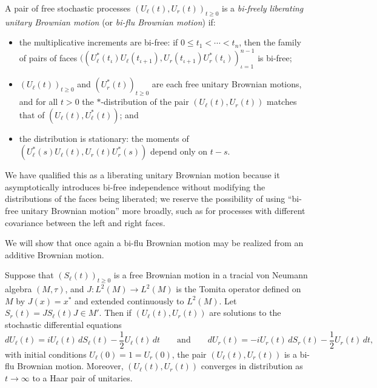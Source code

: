\begin{definition}
	A pair of free stochastic processes $(U_\ell(t), U_r(t))_{t\geq0}$ is a \emph{bi-freely liberating unitary Brownian motion} (or \emph{bi-flu Brownian motion}) if:
	\begin{itemize}
		\item the multiplicative increments are bi-free: if $0\leq t_1 < \cdots < t_n$, then the family of pairs of faces $((U_\ell^*(t_\iota)U_\ell(t_{\iota+1}), U_r(t_{\iota+1})U_r^*(t_\iota))_{\iota=1}^{n-1}$ is bi-free;
		\item $(U_\ell(t))_{t\geq0}$ and $(U^*_r(t))_{t\geq0}$ are each free unitary Brownian motions, and for all $t > 0$ the $*$-distribution of the pair $(U_\ell(t), U_r(t))$ matches that of $(U_\ell(t), U_\ell^*(t))$; and
		\item the distribution is stationary: the moments of $(U_\ell^*(s)U_\ell(t), U_r(t)U_r^*(s))$ depend only on $t-s$.
	\end{itemize}
\end{definition}
We have qualified this as a liberating unitary Brownian motion because it asymptotically introduces bi-free independence without modifying the distributions of the faces being liberated; we reserve the possibility of using ``bi-free unitary Brownian motion'' more broadly, such as for processes with different covariance between the left and right faces.

We will show that once again a bi-flu Brownian motion may be realized from an additive Brownian motion.
\begin{lemma}
	Suppose that $(S_\ell(t))_{t\geq0}$ is a free Brownian motion in a tracial von Neumann algebra $(M, \tau)$, and $J : L^2(M) \to L^2(M)$ is the Tomita operator defined on $M$ by $J(x) = x^*$ and extended continuously to $L^2(M)$.
	Let $S_r(t) = JS_\ell(t)J \in M'$.
	Then if $(U_\ell(t), U_r(t))$ are solutions to the stochastic differential equations
	$$dU_\ell(t) = iU_\ell(t)\,dS_\ell(t) - \frac12 U_\ell(t)\,dt \qquad\text{and}\qquad dU_r(t) = -iU_r(t)\,dS_r(t) - \frac12 U_r(t)\,dt,$$
	with initial conditions $U_\ell(0) = 1 = U_r(0)$, the pair $(U_\ell(t), U_r(t))$ is a bi-flu Brownian motion.
	Moreover, $(U_\ell(t), U_r(t))$ converges in distribution as $t \to \infty$ to a Haar pair of unitaries.
\end{lemma}

